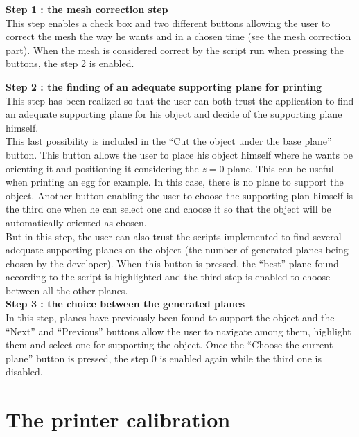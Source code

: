 \documentclass{report}
\begin{document}
\textbf{Step 1 : the mesh correction step} \\

This step enables a check box and two different buttons allowing the user to correct the mesh the way he wants and in a chosen time (see the mesh correction part). When the mesh is considered correct by the script run when pressing the buttons, the step 2 is enabled.

\textbf{Step 2 : the finding of an adequate supporting plane for printing}\\

This step has been realized so that the user can both trust the application to find an adequate supporting plane for his object and decide of the supporting plane himself. \\

This last possibility is included in the ``Cut the object under the base plane'' button. This button allows the user to place his object himself where he wants be orienting it and positioning it considering the $z = 0$ plane. This can be useful when printing an egg for example. In this case, there is no plane to support the object. Another button enabling the user to choose the supporting plan himself is the third one when he can select one and choose it so that the object will be automatically oriented as chosen.\\

But in this step, the user can also trust the scripts implemented to find several adequate supporting planes on the object (the number of generated planes being chosen by the developer). When this button is pressed, the ``best'' plane found according to the script is highlighted and the third step is enabled to choose between all the other planes.\\

\textbf{Step 3 : the choice between the generated planes}\\ 

In this step, planes have previously been found to support the object and the ``Next'' and ``Previous'' buttons allow the user to navigate among them, highlight them and select one for supporting the object. Once the ``Choose the current plane'' button is pressed, the step 0 is enabled again while the third one is disabled. 

\chapter{The printer calibration}
\end{document}
